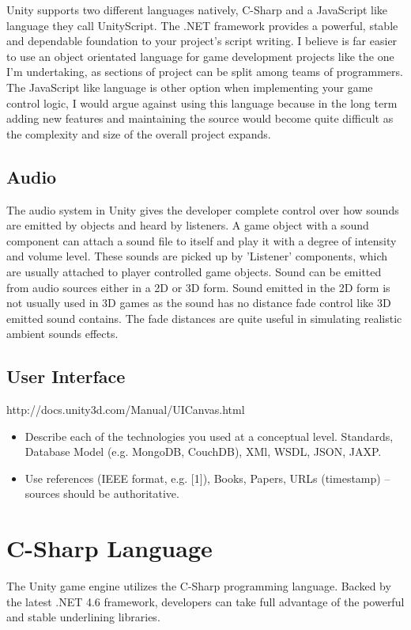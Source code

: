 Unity supports two different languages natively, C-Sharp and a JavaScript like language they call UnityScript. The .NET framework provides a powerful, stable and dependable foundation to your project's script writing. I believe is far easier to use an object orientated language for game development projects like the one I'm undertaking, as sections of project can be split among teams of programmers. 
The JavaScript like language is other option when implementing your game control logic, I would argue against using this language because in the long term adding new features and maintaining the source would become quite difficult as the complexity and size of the overall project expands.

\subsection{Audio}
The audio system in Unity gives the developer complete control over how sounds are emitted by objects and heard by listeners. A game object with a sound component can attach a sound file to itself and play it with a degree of intensity and volume level. These sounds are picked up by 'Listener' components, which are usually attached to player controlled game objects. Sound can be emitted from audio sources either in a 2D or 3D form. Sound emitted in the 2D form is not usually used in 3D games as the sound has no distance fade control like 3D emitted sound contains. The fade distances are quite useful in simulating realistic ambient sounds effects.

\subsection{User Interface}
http://docs.unity3d.com/Manual/UICanvas.html

\begin{itemize}
\item Describe each of the technologies you used at a conceptual level. Standards, Database Model (e.g. MongoDB, CouchDB), XMl, WSDL, JSON, JAXP.
\item Use references (IEEE format, e.g. [1]), Books, Papers, URLs (timestamp) – sources should be authoritative. 
\end{itemize}

\section{C-Sharp Language}
The Unity game engine utilizes the C-Sharp programming language. Backed by the latest .NET 4.6 framework, developers can take full advantage of the powerful and stable underlining libraries. 

